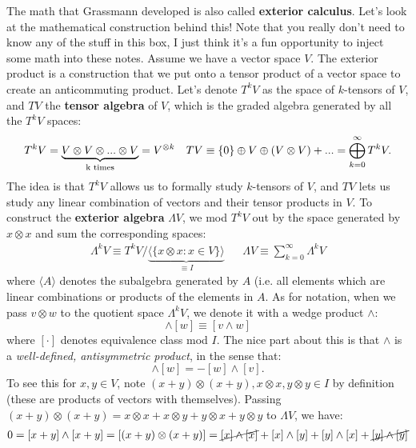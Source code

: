 \documentclass[12pt, oneside]{article}   	%
\theoremstyle{definition}
\begin{document}
\begin{itemize}
\begin{answerbox}
	\raggedright
	The math that Grassmann developed is also called \textbf{exterior calculus}. Let's look at the mathematical construction behind this! Note that you really don't need to know any of the stuff in this box, I just think it's a fun opportunity to inject some math into these notes. Assume we have a vector space $V$. The exterior product is a construction that we put onto a tensor product of a vector space to create an anticommuting product. Let's denote $T^k V$ as the space of $k$-tensors of $V$, and $TV$ the \textbf{tensor algebra} of $V$, which is the graded algebra generated by all the $T^kV$ spaces:
	\begin{align}
		T^k V = \underbrace{V\otimes V\otimes ... \otimes V}_{\textnormal{k times}} = V^{\otimes k} && TV \equiv \{0\}\oplus V\oplus (V\otimes V) + ... = \bigoplus_{k = 0}^\infty T^k V.
	\end{align}
	The idea is that $T^kV$ allows us to formally study $k$-tensors of $V$, and $TV$ lets us study any linear combination of vectors and their tensor products in $V$. To construct the \textbf{exterior algebra} $\Lambda V$, we mod $T^k V$ out by the space generated by $x\otimes x$ and sum the corresponding spaces:
	\begin{align}
		\Lambda^k V \equiv T^k V / \underbrace{\langle \{x\otimes x : x\in V\} \rangle}_{\equiv I} && \Lambda V\equiv \sum_{k = 0}^\infty \Lambda^k V
	\end{align}
	where $\langle A \rangle$ denotes the subalgebra generated by $A$ (i.e. all elements which are linear combinations or products of the elements in $A$. As for notation, when we pass $v\otimes w$ to the quotient space $\Lambda^k V$, we denote it with a wedge product $\wedge$:
	\begin{equation}
		[v]\wedge [w]\equiv [v\wedge w]
	\end{equation}
	where $[\cdot]$ denotes equivalence class mod $I$. The nice part about this is that $\wedge$ is a \textit{well-defined, antisymmetric product}, in the sense that:
	\begin{equation}
		[v]\wedge [w] = -[w]\wedge [v]. 
	\end{equation}
	To see this for $x, y\in V$, note $(x + y)\otimes (x + y), x\otimes x, y\otimes y\in I$ by definition (these are products of vectors with themselves). Passing $(x + y)\otimes (x + y) = x\otimes x + x\otimes y + y\otimes x + y\otimes y$ to $\Lambda V$, we have:
	\begin{align}\begin{split}
		0 &= [x + y]\wedge [x + y] = [(x + y)\otimes (x + y)] = \cancel{[x]\wedge [x]} + [x]\wedge [y] + [y]\wedge [x] + \cancel{[y]\wedge[y]} \\

\end{split}
\end{align}
\end{answerbox}
\end{itemize}
\end{document}
